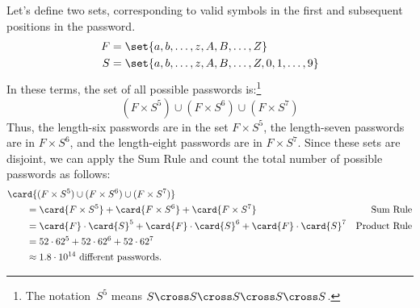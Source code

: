 Let's define two sets, corresponding to valid symbols in the first and
subsequent positions in the password.
%
\begin{align*}
F & = \set{ a, b, \ldots, z, A, B, \ldots, Z } \\
S & = \set{ a, b, \ldots, z, A, B, \ldots, Z, 0, 1, \ldots, 9 }
\end{align*}
%
In these terms, the set of all possible passwords is:\footnote{The
  notation~$S^5$ means $S \cross S \cross S \cross S \cross S$.}
%
\[
(F \times S^5) \cup (F \times S^6) \cup (F \times S^7)
\]
%
Thus, the length-six passwords are in the set $F \times S^5$, the
length-seven passwords are in $F \times S^6$, and the length-eight
passwords are in $F \times S^7$.  Since these sets are disjoint, we
can apply the Sum Rule and count the total number of possible
passwords as follows:
%
\begin{align*}
\lefteqn{\card{(F \times S^5) \cup (F \times S^6) \cup (F \times S^7)}}
\qquad & \\
    & = \card{F \times S^5} + \card{F \times S^6} + \card{F \times S^7}
        & \text{Sum Rule} \\
    & = \card{F} \cdot \card{S}^5 +
          \card{F} \cdot \card{S}^6 +
          \card{F} \cdot \card{S}^7
        & \text{Product Rule} \\
    & = 52 \cdot 62^5 + 52 \cdot 62^6 + 52 \cdot 62^7 \\
    & \approx 1.8 \cdot 10^{14} \text{ different passwords}.
\end{align*}



\begin{problems}
\practiceproblems
{}

\classproblems
{}
\end{problems}

